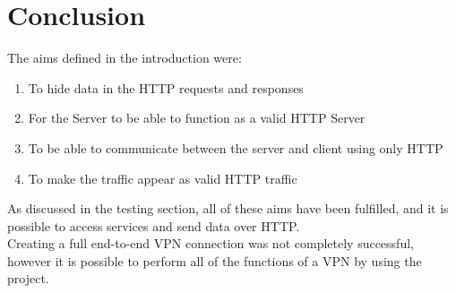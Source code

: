 \section{Conclusion}
The aims defined in the introduction were:
\begin{enumerate}
    \item To hide data in the HTTP requests and responses
    \item For the Server to be able to function as a valid HTTP Server
    \item To be able to communicate between the server and client using only HTTP
    \item To make the traffic appear as valid HTTP traffic
\end{enumerate}
As discussed in the testing section, all of these aims have been fulfilled, and it is possible to access services and send data over HTTP.\\
Creating a full end-to-end VPN connection was not completely successful, however it is possible to perform all of the functions of a VPN by using the project.
